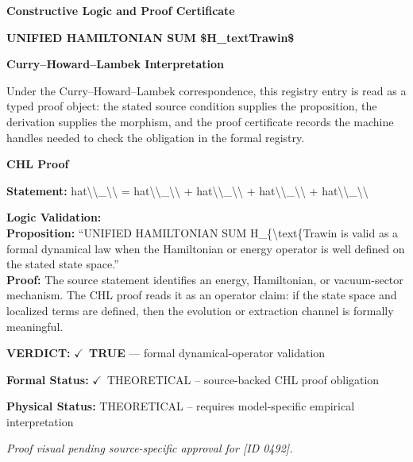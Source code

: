 \clearpage
\begingroup\tzpsupportsetup
\noindent\textbf{\fontsize{10.8pt}{12.8pt}\selectfont [ID 0492] Constructive Logic and Proof Certificate}\par
\noindent\textbf{\fontsize{10pt}{12pt}\selectfont UNIFIED HAMILTONIAN SUM \$H\_textTrawin\$}\par
\vspace{0.45em}
\begingroup
\footnotesize
\setlength{\parskip}{0.22em}
\setlength{\parindent}{0pt}
\noindent\textbf{Curry--Howard--Lambek Interpretation}\par
Under the Curry--Howard--Lambek correspondence, this registry entry is read as a typed proof
object: the stated source condition supplies the proposition, the derivation supplies the
morphism, and the proof certificate records the machine handles needed to check the obligation
in the formal registry.

\vspace{0.45em}
\noindent\textbf{CHL Proof}\par
\textbf{Statement:} hat\textbackslash{}\textbackslash{}\_\textbackslash{}\textbackslash{} = hat\textbackslash{}\textbackslash{}\_\textbackslash{}\textbackslash{} + hat\textbackslash{}\textbackslash{}\_\textbackslash{}\textbackslash{} + hat\textbackslash{}\textbackslash{}\_\textbackslash{}\textbackslash{} + hat\textbackslash{}\textbackslash{}\_\textbackslash{}\textbackslash{}

\textbf{Logic Validation:}\\
\textbf{Proposition:} ``UNIFIED HAMILTONIAN SUM H\_\{\textbackslash{}text\{Trawin is valid as a formal dynamical law when the
Hamiltonian or energy operator is well defined on the stated state space.''\\
\textbf{Proof:} The source statement identifies an energy, Hamiltonian, or vacuum-sector mechanism. The
CHL proof reads it as an operator claim: if the state space and localized terms are
defined, then the evolution or extraction channel is formally meaningful.

\textbf{VERDICT:} \ensuremath{\checkmark}\ \textbf{TRUE} --- formal dynamical-operator validation

\textbf{Formal Status:} \ensuremath{\checkmark}\ THEORETICAL -- source-backed CHL proof obligation

\textbf{Physical Status:} THEORETICAL -- requires model-specific empirical interpretation
\par\vspace{0.45em}
\par
\vfill
\begingroup\footnotesize\itshape
Proof visual pending source-specific approval for [ID 0492].
\par\endgroup
\vfill
\endgroup
\endgroup
